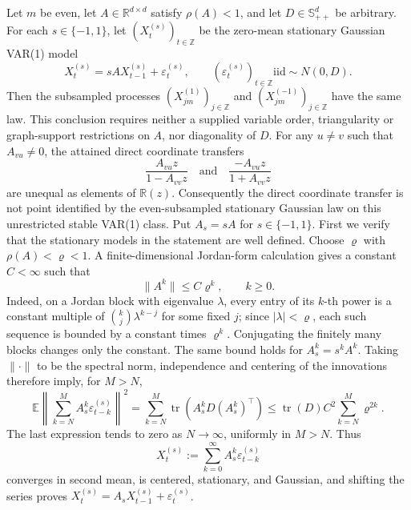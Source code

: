 Let \(m\) be even, let \(A\in\mathbb R^{d\times d}\) satisfy \(\rho(A)<1\), and let \(D\in\mathbb S_{++}^{d}\) be arbitrary.  For each \(s\in\{-1,1\}\), let \((X_t^{(s)})_{t\in\mathbb Z}\) be the zero-mean stationary Gaussian VAR(1) model
\[
 X_t^{(s)}=sA X_{t-1}^{(s)}+\varepsilon_t^{(s)},
 \qquad
 (\varepsilon_t^{(s)})_{t\in\mathbb Z}\mathrel{\mathrm{iid}}\sim N(0,D).
\]
Then the subsampled processes \((X_{jm}^{(1)})_{j\in\mathbb Z}\) and \((X_{jm}^{(-1)})_{j\in\mathbb Z}\) have the same law.  This conclusion requires neither a supplied variable order, triangularity or graph-support restrictions on \(A\), nor diagonality of \(D\).  For any \(u\ne v\) such that \(A_{vu}\ne0\), the attained direct coordinate transfers
\[
 \frac{A_{vu}z}{1-A_{vv}z}
 \quad\text{and}\quad
 \frac{-A_{vu}z}{1+A_{vv}z}
\]
are unequal as elements of \(\mathbb R(z)\).  Consequently the direct coordinate transfer is not point identified by the even-subsampled stationary Gaussian law on this unrestricted stable VAR(1) class.
Put \(A_s=sA\) for \(s\in\{-1,1\}\).  First we verify that the stationary models in the statement are well defined.  Choose \(\varrho\) with \(\rho(A)<\varrho<1\).  A finite-dimensional Jordan-form calculation gives a constant \(C<\infty\) such that
\[
 \lVert A^k\rVert\le C \varrho^k,
 \qquad k\ge0.
\]
Indeed, on a Jordan block with eigenvalue \(\lambda\), every entry of its \(k\)-th power is a constant multiple of \(\binom{k}{j}\lambda^{k-j}\) for some fixed \(j\); since \(|\lambda|<\varrho\), each such sequence is bounded by a constant times \(\varrho^k\).  Conjugating the finitely many blocks changes only the constant.  The same bound holds for \(A_s^k=s^kA^k\).  Taking \(\lVert\cdot\rVert\) to be the spectral norm, independence and centering of the innovations therefore imply, for \(M>N\),
\[
 \mathbb E\left\lVert
   \sum_{k=N}^{M}A_s^k\varepsilon_{t-k}^{(s)}
 \right\rVert^2
 =\sum_{k=N}^{M}\operatorname{tr}
   \left(A_s^kD(A_s^k)^\top\right)
 \le \operatorname{tr}(D)C^2\sum_{k=N}^{M}\varrho^{2k}.
\]
The last expression tends to zero as \(N\to\infty\), uniformly in \(M>N\).  Thus
\[
 X_t^{(s)}:=\sum_{k=0}^{\infty}A_s^k\varepsilon_{t-k}^{(s)}
\]
converges in second mean, is centered, stationary, and Gaussian, and shifting the series proves
\(X_t^{(s)}=A_sX_{t-1}^{(s)}+\varepsilon_t^{(s)}\).

